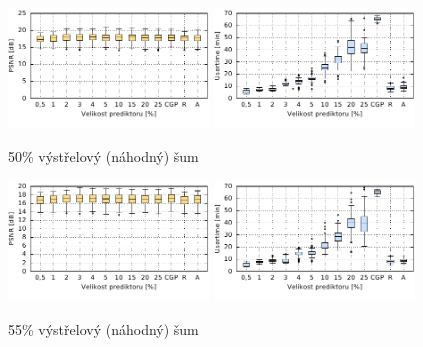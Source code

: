 \begin{figure}[H]
    \centering
    \includegraphics[width=0.475\textwidth]{fig/plot/compare/impulse50-100kg-psnrtest.pdf}
    \hskip0.5cm
    \includegraphics[width=0.475\textwidth]{fig/plot/compare/impulse50-100kg-usertime.pdf}
    \caption{50\% výstřelový (náhodný) šum}
\end{figure}

\begin{figure}[H]
    \centering
    \includegraphics[width=0.475\textwidth]{fig/plot/compare/impulse55-100kg-psnrtest.pdf}
    \hskip0.5cm
    \includegraphics[width=0.475\textwidth]{fig/plot/compare/impulse55-100kg-usertime.pdf}
    \caption{55\% výstřelový (náhodný) šum}
\end{figure}


